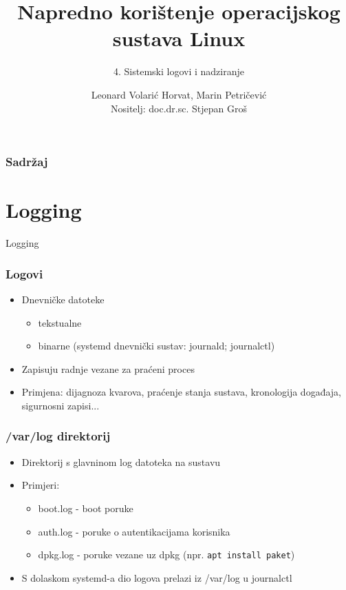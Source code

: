 \documentclass[t,table,usenames,dvipsnames]{beamer}
\date{\todayiso}
\title[NKOSL]{Napredno korištenje operacijskog sustava Linux}
\author[Leonard Volarić Horvat, Marin Petričević]{Leonard Volarić Horvat, Marin Petričević\\{\small Nositelj: doc.dr.sc. Stjepan Groš}}
\subtitle{4. Sistemski logovi i nadziranje}
\institute[FER]{Sveučilište u Zagrebu\\Fakultet elektrotehnike i računarstva}
\newcommand{\shell}[1]{\texttt{#1}}
\begin{document}
{
	\begin{frame}
		\maketitle
	\end{frame}
}

\begin{frame}
    \frametitle{Sadržaj}
    \tableofcontents
\end{frame}

\section{Logging}

\begin{frame}
    \vspace*{\fill}
        \begin{center}
            \Huge{Logging}
        \end{center}
    \vspace*{\fill}
\end{frame}


\begin{frame}
    \frametitle{Logovi}
    \begin{itemize}
        \item Dnevničke datoteke 
        \begin{itemize}
            \item tekstualne
            \item binarne (systemd dnevnički sustav: journald; journalctl)
        \end{itemize}
        \item Zapisuju radnje vezane za praćeni proces
        \item Primjena: dijagnoza kvarova, praćenje stanja sustava, kronologija događaja, sigurnosni zapisi...
    \end{itemize}
\end{frame}



\begin{frame}
    \frametitle{/var/log direktorij}
    \begin{itemize}
        \item Direktorij s glavninom log datoteka na sustavu
        \item Primjeri:
        \begin{itemize}
            \item boot.log - boot poruke
            \item auth.log - poruke o autentikacijama korisnika
            \item dpkg.log - poruke vezane uz dpkg (npr. \shell{apt install paket})
        \end{itemize}
        \item S dolaskom systemd-a dio logova prelazi iz /var/log u journalctl
    \end{itemize}
\end{frame}
\end{document}
